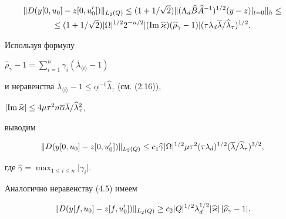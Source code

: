 \begin{gather*}


\ver D(y[0,u_0]-z[0,u_0'])\ver_{L_2(Q)} \le (1+


1/\sqrt 2)\ver(\Lambda_d\bbb\aaa^{-1})^{1/2} (y-z)\vert_{t=0}\ver_h \le\\


%


\le(1+1/\sqrt 2)\vert\Omega\vert^{1/2}2^{-n/2}\vert


(\text{Im\,}\widehat\varkappa)(\widehat\rho_\gamma-1)\vert(\tau\lambda_d


\overline\lambda/\widehat\lambda_\tau)^{1/2}.


\end{gather*}


Используя формулу 


$\widehat\rho_\gamma-1=\sum_{i=1}^n\gamma_i(\overline\lambda_{\langle i\rangle}-1)$


и неравенства $\overline\lambda_{\langle i\rangle}-1\le


\underline\alpha^{-1}\widehat\lambda_\tau$ (см. (2.16)),


$\vert\text{Im\,}\widehat\varkappa\vert\le 4\mu\tau^2 n\overline\alpha


\overline\lambda/\widehat\lambda^2_\tau$, 


выводим


\begin{equation}


\ver D(y[0,u_0]-z[0,u_0'])\ver_{L_2(Q)}\le c_1


\widehat\gamma\vert\Omega\vert^{1/2}\mu


\tau^2(\tau\lambda_d)^{1/2}(\overline\lambda/


\widehat\lambda_\tau)^{3/2},


\end{equation}


где $\widehat\gamma={\max}_{1\le i\le n}\vert\gamma_i\vert$.





Аналогично неравенству (4.5) имеем


\begin{equation}


\ver D(y[f,u_0]-z[f,u_0'])\ver_{L_2(Q)}\ge c_2\vert Q


\vert^{1/2}\lambda_d^{1/2}\vert\widehat\varkappa\vert\,


\vert\widehat\rho_\gamma-1\vert.


\end{equation}


